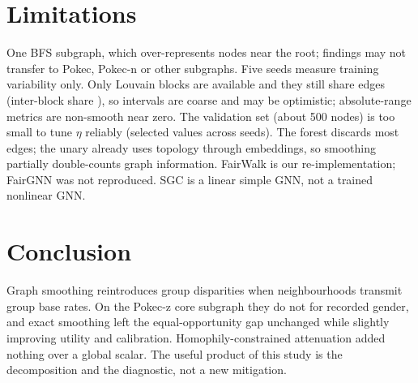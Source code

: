 \documentclass[11pt,a4paper]{article}
\begin{document}
\section{Limitations}
One BFS subgraph, which over-represents nodes near the root; findings may not transfer to Pokec, Pokec-n or other subgraphs. Five seeds measure training variability only. Only \RNBlocks{} Louvain blocks are available and they still share edges (inter-block share \RInterblockShare), so intervals are coarse and may be optimistic; absolute-range metrics are non-smooth near zero. The validation set (about 500 nodes) is too small to tune $\eta$ reliably (selected values \REtaFwList{} across seeds). The forest discards most edges; the unary already uses topology through embeddings, so smoothing partially double-counts graph information. FairWalk is our re-implementation; FairGNN was not reproduced. SGC is a linear simple GNN, not a trained nonlinear GNN.

\section{Conclusion}
Graph smoothing reintroduces group disparities when neighbourhoods transmit group base rates. On the Pokec-z core subgraph they do not for recorded gender, and exact smoothing left the equal-opportunity gap unchanged while slightly improving utility and calibration. Homophily-constrained attenuation added nothing over a global scalar. The useful product of this study is the decomposition and the diagnostic, not a new mitigation.
\end{document}
